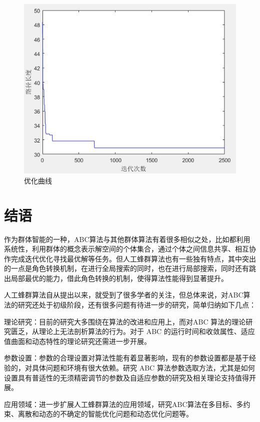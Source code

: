 \documentclass[a4paper,12pt]{report}
\begin{document}
\begin{spacing}{1.5}
		\begin{figure}[htbp]
			\centering
			\includegraphics[width=.8\textwidth]{pic/bee9.png}
			\caption{优化曲线}
			\label{fig:pt3}
		\end{figure}

\end{spacing}


\chapter{结语}

\begin{spacing}{1.5}
	作为群体智能的一种，ABC算法与其他群体算法有着很多相似之处，比如都利用系统性，利用群体的概念表示解空间的个体集合，通过个体之间信息共享、相互协作完成迭代优化寻找最优解等任务。但人工蜂群算法也有一些独有特点，其中突出的一点是角色转换机制，在进行全局搜索的同时，也在进行局部搜索，同时还有跳出局部最优的能力，借此角色转换的机制，使得算法性能得到显著提升。

	人工蜂群算法自从提出以来，就受到了很多学者的关注，但总体来说，对ABC算法的研究还处于初级阶段，还有很多问题有待进一步的研究，简单归纳如下几点：
	
	理论研究：目前的研究大多围绕在算法的改进和应用上，而对ABC 算法的理论研究匮乏，从理论上无法剖析算法的行为。对于 ABC 的运行时间和收敛属性、适应值曲面和动态特性的理论研究还需进一步开展。

	参数设置：参数的合理设置对算法性能有着显著影响，现有的参数设置都是基于经验的，对具体问题和环境有很大依赖。研究 ABC 算法参数选取方法，尤其是如何设置具有普适性的无须精密调节的参数及自适应参数的研究及相关理论支持值得开展。
		
	应用领域：进一步扩展人工蜂群算法的应用领域，研究ABC算法在多目标、多约束、离散和动态的不确定的智能优化问题和动态优化问题等。

\end{spacing}
\end{document}
